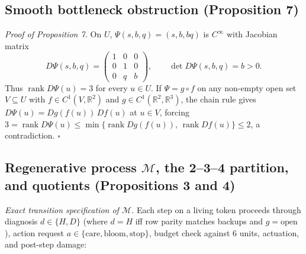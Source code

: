 \documentclass[11pt,a4paper]{article}
\begin{document}
\subsection{Smooth bottleneck obstruction (Proposition
7)}\label{smooth-bottleneck-obstruction-proposition-7}

\emph{Proof of Proposition 7.} On \(U\), \(\Psi(s,b,q) = (s, b, bq)\) is
\(C^\infty\) with Jacobian matrix
\[D\Psi(s,b,q) = \begin{pmatrix} 1 & 0 & 0 \\ 0 & 1 & 0 \\ 0 & q & b \end{pmatrix}, \qquad \det D\Psi(s,b,q) = b > 0.\]
Thus \(\operatorname{rank} D\Psi(u) = 3\) for every \(u \in U\). If
\(\Psi = g \circ f\) on any non-empty open set \(V \subseteq U\) with
\(f \in C^1(V, \mathbb{R}^2)\) and
\(g \in C^1(\mathbb{R}^2, \mathbb{R}^3)\), the chain rule gives
\(D\Psi(u) = Dg(f(u))\, Df(u)\) at \(u \in V\), forcing
\(3 = \operatorname{rank} D\Psi(u) \le \min\{\operatorname{rank} Dg(f(u)),\, \operatorname{rank} Df(u)\} \le 2\),
a contradiction. \(\square\)

\subsection{\texorpdfstring{Regenerative process \(\mathcal{M}\), the
2--3--4 partition, and quotients (Propositions 3 and
4)}{Regenerative process \textbackslash mathcal\{M\}, the 2--3--4 partition, and quotients (Propositions 3 and 4)}}\label{regenerative-process-mathcalm-the-234-partition-and-quotients-propositions-3-and-4}

\emph{Exact transition specification of \(\mathcal{M}\).} Each step on a
living token proceeds through diagnosis \(d \in \{H, D\}\) (where
\(d = H\) iff row parity matches backups and \(g = \mathrm{open}\)),
action request
\(a \in \{\mathrm{care}, \mathrm{bloom}, \mathrm{stop}\}\), budget check
against \(6\) units, actuation, and post-step damage:
\end{document}
